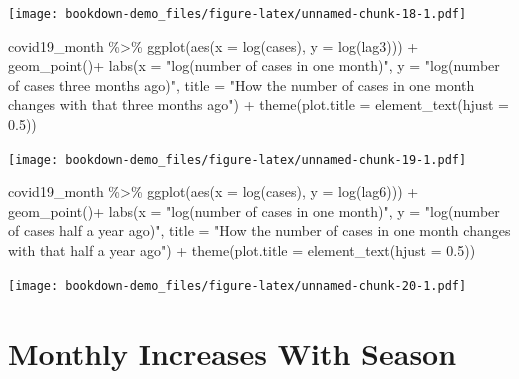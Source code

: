 \documentclass[
]{book}
\newenvironment{Shaded}{\begin{snugshade}}{\end{snugshade}}
\newcommand{\AttributeTok}[1]{\textcolor[rgb]{0.77,0.63,0.00}{#1}}
\newcommand{\FloatTok}[1]{\textcolor[rgb]{0.00,0.00,0.81}{#1}}
\newcommand{\FunctionTok}[1]{\textcolor[rgb]{0.00,0.00,0.00}{#1}}
\newcommand{\NormalTok}[1]{#1}
\newcommand{\SpecialCharTok}[1]{\textcolor[rgb]{0.00,0.00,0.00}{#1}}
\newcommand{\StringTok}[1]{\textcolor[rgb]{0.31,0.60,0.02}{#1}}
\begin{document}
\texttt{[image: bookdown-demo\_files/figure-latex/unnamed-chunk-18-1.pdf]}

\begin{Shaded}
\begin{Highlighting}[]
\NormalTok{covid19\_month }\SpecialCharTok{\%\textgreater{}\%}
  \FunctionTok{ggplot}\NormalTok{(}\FunctionTok{aes}\NormalTok{(}\AttributeTok{x =} \FunctionTok{log}\NormalTok{(cases), }\AttributeTok{y =} \FunctionTok{log}\NormalTok{(lag3))) }\SpecialCharTok{+}
  \FunctionTok{geom\_point}\NormalTok{()}\SpecialCharTok{+}
  \FunctionTok{labs}\NormalTok{(}\AttributeTok{x =} \StringTok{"log(number of cases in one month)"}\NormalTok{, }\AttributeTok{y =} \StringTok{"log(number of cases three months ago)"}\NormalTok{, }\AttributeTok{title =} \StringTok{"How the number of cases in one month changes with that three months ago"}\NormalTok{) }\SpecialCharTok{+}
  \FunctionTok{theme}\NormalTok{(}\AttributeTok{plot.title =} \FunctionTok{element\_text}\NormalTok{(}\AttributeTok{hjust =} \FloatTok{0.5}\NormalTok{))}
\end{Highlighting}
\end{Shaded}

\texttt{[image: bookdown-demo\_files/figure-latex/unnamed-chunk-19-1.pdf]}

\begin{Shaded}
\begin{Highlighting}[]
\NormalTok{covid19\_month }\SpecialCharTok{\%\textgreater{}\%}
  \FunctionTok{ggplot}\NormalTok{(}\FunctionTok{aes}\NormalTok{(}\AttributeTok{x =} \FunctionTok{log}\NormalTok{(cases), }\AttributeTok{y =} \FunctionTok{log}\NormalTok{(lag6))) }\SpecialCharTok{+}
  \FunctionTok{geom\_point}\NormalTok{()}\SpecialCharTok{+}
  \FunctionTok{labs}\NormalTok{(}\AttributeTok{x =} \StringTok{"log(number of cases in one month)"}\NormalTok{, }\AttributeTok{y =} \StringTok{"log(number of cases half a year ago)"}\NormalTok{, }\AttributeTok{title =} \StringTok{"How the number of cases in one month changes with that half a year ago"}\NormalTok{) }\SpecialCharTok{+}
  \FunctionTok{theme}\NormalTok{(}\AttributeTok{plot.title =} \FunctionTok{element\_text}\NormalTok{(}\AttributeTok{hjust =} \FloatTok{0.5}\NormalTok{))}
\end{Highlighting}
\end{Shaded}

\texttt{[image: bookdown-demo\_files/figure-latex/unnamed-chunk-20-1.pdf]}

\hypertarget{monthly-increases-with-season}{%
\section{Monthly Increases With Season}\label{monthly-increases-with-season}}
\end{document}
